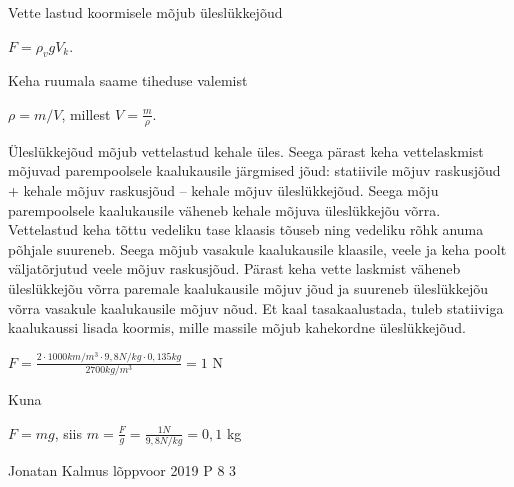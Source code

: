 \documentclass[11pt]{article}
\begin{document}
{{\ifSolution
Vette lastud koormisele mõjub üleslükkejõud
\begin{center}
$F = \rho_v gV_k$.
\end{center}
Keha ruumala saame tiheduse valemist
\begin{center}
$\rho = m/V$, millest $V = \frac{m}{\rho}$.
\end{center}
Üleslükkejõud mõjub vettelastud kehale üles. Seega pärast keha vettelaskmist mõjuvad parempoolsele kaalukausile järgmised jõud: statiivile mõjuv raskusjõud + kehale mõjuv raskusjõud – kehale mõjuv üleslükkejõud. Seega mõju parempoolsele kaalukausile väheneb kehale mõjuva üleslükkejõu võrra. Vettelastud keha tõttu vedeliku tase klaasis tõuseb ning vedeliku rõhk anuma põhjale suureneb. Seega mõjub vasakule kaalukausile klaasile, veele ja keha poolt väljatõrjutud veele mõjuv raskusjõud. Pärast keha vette laskmist väheneb üleslükkejõu võrra paremale kaalukausile mõjuv jõud ja suureneb üleslükkejõu võrra vasakule kaalukausile mõjuv nõud. Et kaal tasakaalustada, tuleb statiiviga kaalukaussi lisada koormis, mille massile mõjub kahekordne üleslükkejõud.
\begin{center}
$F = \frac{2 \cdot 1000 km/m^3 \cdot 9,8 N/kg \cdot 0,135kg}{2700 kg/m^3} = 1$ N
\end{center}
Kuna
\begin{center}
$F = mg$, siis $m = \frac{F}{g} = \frac{1 N}{9,8 N/kg} = 0,1$ kg
\end{center}
\fi
}

{Jonatan Kalmus} %
{lõppvoor} %
{2019} %
{P 8} %
{3} %
{

}}
\end{document}
